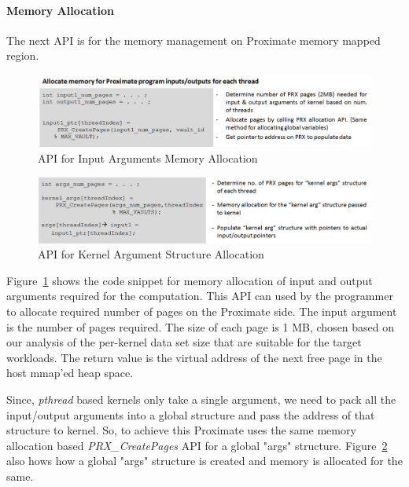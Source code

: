 \paragraph{Memory Allocation}
The next API is for the memory management on Proximate memory mapped region. 

\begin{figure}[h]
  \begin{center}
    \includegraphics[width=\linewidth]{cs758-figs/api-copy.png}
  \end{center}
\vspace{-0.2in}
  \caption{API for Input Arguments Memory Allocation}
  \label{fig:api-mem}
\vspace{-0.05in}
\end{figure}

\begin{figure}
  \begin{center}
    \includegraphics[width=\linewidth]{cs758-figs/api-arg.png}
  \end{center}
\vspace{-0.2in}
  \caption{API for Kernel Argument Structure Allocation}
  \label{fig:api-arg}
\vspace{-0.05in}
\end{figure}

Figure~\ref{fig:api-mem} shows the code snippet for 
memory allocation of input and output arguments required for the computation.
This API can used by the programmer to allocate required number of pages on the Proximate side. 
The input argument is the number of pages required. The size of each page is 1 MB, chosen based on our 
analysis of the per-kernel data set size that are suitable for the target workloads. 
The return value is the virtual address of the next free page in the host mmap’ed heap space. 

Since, \emph{pthread} based kernels only take a single argument, we
need to pack all the input/output arguments into a global structure and pass the address of that
structure to kernel. So, to achieve this Proximate uses the same memory allocation
based \emph{PRX\_CreatePages} API for a global "args" structure.
Figure~\ref{fig:api-arg} also hows how a global "args" structure is created and memory is allocated for the same. 

